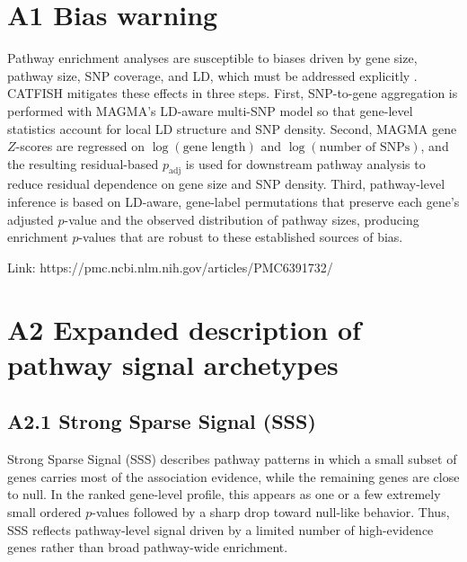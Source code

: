 \documentclass[unnumsec,webpdf,contemporary,large]{oup-authoring-template}%
\theoremstyle{thmstyleone}%
\theoremstyle{thmstyletwo}%
\theoremstyle{thmstylethree}%
\begin{document}
\begin{appendices}





\section{A1 Bias warning}

Pathway enrichment analyses are susceptible to biases driven by gene size, pathway size, SNP coverage, and LD, which must be addressed explicitly \citep{White2019}. CATFISH mitigates these effects in three steps. First, SNP-to-gene aggregation is performed with MAGMA's LD-aware multi-SNP model so that gene-level statistics account for local LD structure and SNP density. Second, MAGMA gene $Z$-scores are regressed on $\log(\text{gene length})$ and $\log(\text{number of SNPs})$, and the resulting residual-based $p_{\mathrm{adj}}$ is used for downstream pathway analysis to reduce residual dependence on gene size and SNP density. Third, pathway-level inference is based on LD-aware, gene-label permutations that preserve each gene's adjusted $p$-value and the observed distribution of pathway sizes, producing enrichment $p$-values that are robust to these established sources of bias.

Link: https://pmc.ncbi.nlm.nih.gov/articles/PMC6391732/






\section{A2 Expanded description of pathway signal archetypes}
\label{app:archetype_details}

\subsection{A2.1 Strong Sparse Signal (SSS)}

Strong Sparse Signal (SSS) describes pathway patterns in which a small subset of genes carries most of the association evidence, while the remaining genes are close to null. In the ranked gene-level profile, this appears as one or a few extremely small ordered \(p\)-values followed by a sharp drop toward null-like behavior. Thus, SSS reflects pathway-level signal driven by a limited number of high-evidence genes rather than broad pathway-wide enrichment.


\end{appendices}
\end{document}
